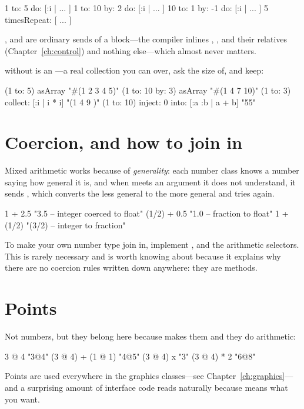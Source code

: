 \begin{st}
1 to: 5 do: [:i | ... ]
1 to: 10 by: 2 do: [:i | ... ]
10 to: 1 by: -1 do: [:i | ... ]
5 timesRepeat: [ ... ]
\end{st}

,  and  are ordinary sends of a
block---the compiler inlines , ,  and
their relatives (Chapter~\ref{ch:control}) and nothing else---which almost
never matters.

 without  is an ---a real collection you can
 over, ask the size of, and keep:

\begin{st}
(1 to: 5) asArray                    "#(1 2 3 4 5)"
(1 to: 10 by: 3) asArray             "#(1 4 7 10)"
(1 to: 3) collect: [:i | i * i]      "(1 4 9 )"
(1 to: 10) inject: 0 into: [:a :b | a + b]   "55"
\end{st}

\section{Coercion, and how to join in}

Mixed arithmetic works because of \emph{generality}: each number class knows a
number saying how general it is, and when \ct{+} meets an argument it does not
understand, it sends , which
converts the less general to the more general and tries again.

\begin{st}
1 + 2.5             "3.5   -- integer coerced to float"
(1/2) + 0.5         "1.0   -- fraction to float"
1 + (1/2)           "(3/2) -- integer to fraction"
\end{st}

To make your own number type join in, implement ,
 and the arithmetic selectors. This is rarely necessary and is
worth knowing about because it explains why there are no coercion rules
written down anywhere: they are methods.

\section{Points}

Not numbers, but they belong here because  makes them and they do
arithmetic:

\begin{st}
3 @ 4                       "3@4"
(3 @ 4) + (1 @ 1)           "4@5"
(3 @ 4) x                   "3"
(3 @ 4) * 2                 "6@8"
\end{st}

Points are used everywhere in the graphics classes---see
Chapter~\ref{ch:graphics}---and a surprising amount of interface code reads
naturally because  means what you want.
